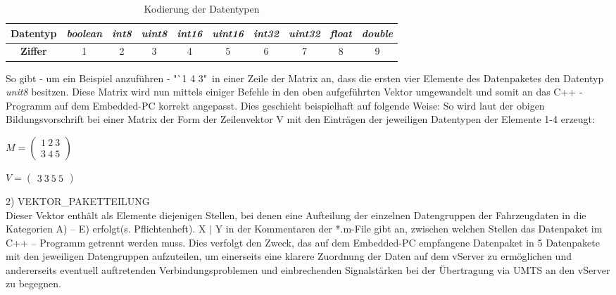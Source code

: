 \documentclass[fontsize = 12pt, paper = a4]{scrreprt}
\begin{document}
\begin{table}[h]

\caption{Kodierung der Datentypen}

\begin{tabular}{ c | c | c | c | c | c | c | c | c | c}
 
\toprule[1.5pt]
\textbf{Datentyp} & \textit{boolean} & \textit{int8} & \textit{uint8} & \textit{int16} & \textit{uint16} & \textit{int32} & \textit{uint32} & \textit{float} & \textit{double}  \\ 

\midrule

\textbf{Ziffer} & 1 & 2 & 3 & 4 & 5 & 6 & 7 & 8 & 9  \\

\bottomrule[1.5pt] 
 
\end{tabular}

\end{table}

So gibt - um ein Beispiel anzuführen - "`1 4 3"\ in einer Zeile der Matrix an, dass die ersten vier Elemente des Datenpaketes den Datentyp \textit{unit8} besitzen. Diese Matrix wird nun mittels einiger Befehle in den oben aufgeführten Vektor umgewandelt und somit an das C++ - Programm auf dem Embedded-PC korrekt angepasst. Dies geschieht beispielhaft auf folgende Weise: So wird laut der obigen Bildungsvorschrift bei einer Matrix der Form der Zeilenvektor V mit den Einträgen der jeweiligen Datentypen der Elemente 1-4 erzeugt: 

\vspace*{4mm}

$ M = \left( \begin{array}{c} 1 \ 2 \ 3 \\ 3 \ 4 \ 5 \end{array} \right)$

\vspace*{4mm}

$ V = \left( \begin{array}{c} 3 \ 3 \ 5 \ 5  \end{array} \right)$

\newpage
 

2) VEKTOR\_PAKETTEILUNG \\

Dieser Vektor enthält als Elemente diejenigen Stellen, bei denen eine Aufteilung der einzelnen Datengruppen der Fahrzeugdaten in die Kategorien A) -- E) erfolgt(s. Pflichtenheft). X $\mid$ Y  in der Kommentaren der *.m-File gibt an, zwischen welchen Stellen das Datenpaket im C++ -- Programm getrennt werden muss. Dies verfolgt den Zweck, das auf dem Embedded-PC empfangene Datenpaket in 5 Datenpakete mit den jeweiligen Datengruppen aufzuteilen, um einerseits eine klarere Zuordnung der Daten auf dem vServer zu ermöglichen und andererseits eventuell auftretenden Verbindungsproblemen und einbrechenden Signalstärken bei der Übertragung via UMTS an den vServer zu begegnen. \\
\end{document}

